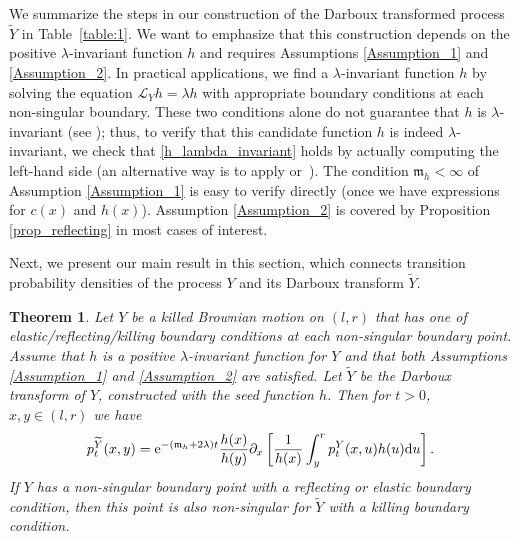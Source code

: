 \documentclass[10pt,a4paper]{amsart}
\numberwithin{equation}{section}
\newtheorem{Theorem}{Theorem}[section]
\theoremstyle{definition}
\def\L{{\mathcal L}}
\def\d{{\textnormal d}}
\begin{document}
We summarize the steps in our construction of the Darboux transformed process $\widetilde Y$ in Table~\ref{table:1}. We want to emphasize that this construction depends on the positive $\lambda$-invariant function $h$ and requires Assumptions
\ref{Assumption_1} and \ref{Assumption_2}.
In practical applications, we find a $\lambda$-invariant function $h$ by solving the equation $\L_Y h =\lambda h$ with appropriate boundary conditions at each non-singular boundary. These two conditions alone do not guarantee that $h$ is $\lambda$-invariant (see \cite{Rogers_2021, Mijatovic_2012}); thus, to verify that this candidate function $h$ is indeed $\lambda$-invariant, we check that \eqref{h_lambda_invariant} holds by actually computing the left-hand side (an alternative way is to apply \cite[Theorem 2.7]{Rogers_2021} or~\cite[Corollary 2.2]{Mijatovic_2012}). The condition ${\mathfrak m}_h< \infty$ of Assumption \ref{Assumption_1} is easy to verify directly (once we have expressions for $c(x)$ and $h(x)$). Assumption \ref{Assumption_2} is covered by Proposition \ref{prop_reflecting} in most cases of interest.

Next, we present our main result in this section, which connects transition probability densities of the process $Y$ and its Darboux transform $\widetilde Y$.


\begin{Theorem}\label{thm:main2} Let $Y$ be a killed Brownian motion on $(l,r)$ that has one of elastic/reflecting/kil\-l\-ing boundary conditions at each non-singular boundary point. Assume that $h$ is a positive $\lambda$-invariant function for $Y$ and that both Assumptions {\rm\ref{Assumption_1}} and
{\rm\ref{Assumption_2}} are satisfied. Let $\widetilde Y$ be the Darboux transform of $Y$, constructed with the seed function $h$. Then for $t>0$, $x,y\in (l,r)$ we have
\begin{equation}\label{equation_tilde_p}
 p^{\widetilde Y}_t(x,y)={\rm e}^{-({\mathfrak m}_h + 2\lambda) t}\frac{h(x)}{h(y)} \partial_{x}
\left[ \frac{1}{h(x)} \int_{y}^r p^{Y}_t(x,u) h(u) \d u \right].
\end{equation}
If $Y$ has a non-singular boundary point with a reflecting or elastic boundary condition, then this point is also non-singular for $\widetilde Y$ with a killing boundary condition.
\end{Theorem}
\end{document}
